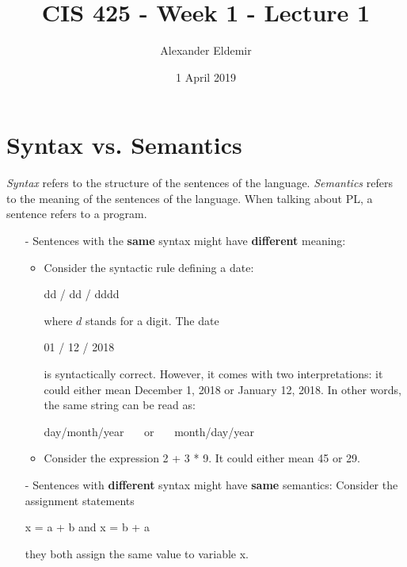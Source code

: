 \documentclass{article}
\title{CIS 425 - Week 1 - Lecture 1}
\author{Alexander Eldemir}
\date{1 April 2019}
\begin{document}
\maketitle

\section{Syntax vs. Semantics}

{\color{red} {\emph{Syntax}}} refers to the structure of the sentences of the language.
\newline
\newline
{\color{red} {\emph{Semantics}} } refers to the meaning of the sentences of the language.
\newline
\newline
When talking about PL, a sentence refers to a program.


\begin{example}
\begin{itemize}
\item[-]
Sentences with the {\bf same} syntax might have {\bf different} meaning:

\begin{itemize}
\item
Consider the syntactic rule defining a date:
\begin{center} dd / dd / dddd  \end{center} 
where $d$ stands for a digit.   The date 
\begin{center}
01 / 12 / 2018
\end{center}
 is syntactically correct. However, it comes with two interpretations:  it could either mean
December 1, 2018 or January 12, 2018.  In other words, the same string can be read as:
\begin{center}
day/month/year ~~~or ~~~month/day/year
\end{center}
\item
Consider the expression 2 + 3 * 9. It could either mean 45 or 29. 
\end{itemize}
\item[-]
Sentences with {\bf different} syntax might have {\bf same}  semantics:
Consider the assignment statements 
\begin{center}
x = a + b   and x = b + a 
\end{center}
they both assign the same value to variable x.
\end{itemize}
\end{example}
\end{document}
